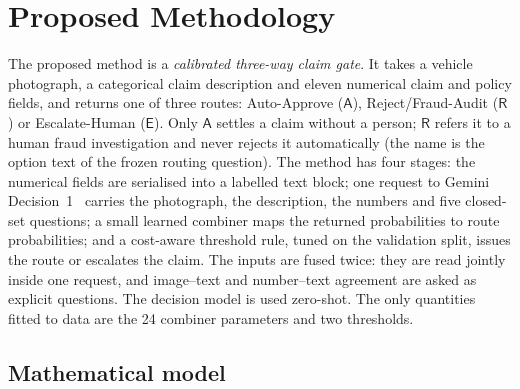 \section{Proposed Methodology}\label{sec:method}

The proposed method is a \emph{calibrated three-way claim gate}. It takes a vehicle photograph, a categorical claim description and eleven numerical claim and policy fields, and returns one of three routes: Auto-Approve ($\mathsf{A}$), Reject/Fraud-Audit ($\mathsf{R}$) or Escalate-Human ($\mathsf{E}$). Only $\mathsf{A}$ settles a claim without a person; $\mathsf{R}$ refers it to a human fraud investigation and never rejects it automatically (the name is the option text of the frozen routing question). The method has four stages: the numerical fields are serialised into a labelled text block; one request to Gemini Decision~1~\cite{google2026decisions} carries the photograph, the description, the numbers and five closed-set questions; a small learned combiner maps the returned probabilities to route probabilities; and a cost-aware threshold rule, tuned on the validation split, issues the route or escalates the claim. The inputs are fused twice: they are read jointly inside one request, and image--text and number--text agreement are asked as explicit questions. The decision model is used zero-shot. The only quantities fitted to data are the 24 combiner parameters and two thresholds.

\subsection{Mathematical model}\label{sec:math}

